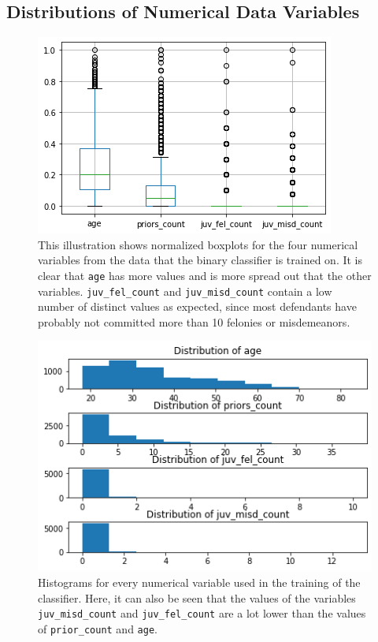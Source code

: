 \documentclass[11pt, fleqn, titlepage]{article}
\begin{document}
	\subsection{Distributions of Numerical Data Variables}
	\begin{figure}
		\centering
		\includegraphics[width=0.5\linewidth]{imgs/boxplot_numericals}
		\caption{This illustration shows normalized boxplots for the four numerical variables from the data that the binary classifier is trained on. It is clear that \texttt{age} has more values and is more spread out that the other variables. \texttt{juv\_fel\_count} and \texttt{juv\_misd\_count} contain a low number of distinct values as expected, since most defendants have probably not committed more than 10 felonies or misdemeanors.}
		\label{fig:boxplotnumericals}
	\end{figure}
	\begin{figure}
		\centering
		\includegraphics[width=0.5\linewidth]{imgs/histogram_numerical}
		\caption{Histograms for every numerical variable used in the training of the classifier. Here, it can also be seen that the values of the variables \texttt{juv\_misd\_count} and \texttt{juv\_fel\_count} are a lot lower than the values of \texttt{prior\_count} and \texttt{age}.}
		\label{fig:histogramnumerical}
	\end{figure}
	
\end{document}
